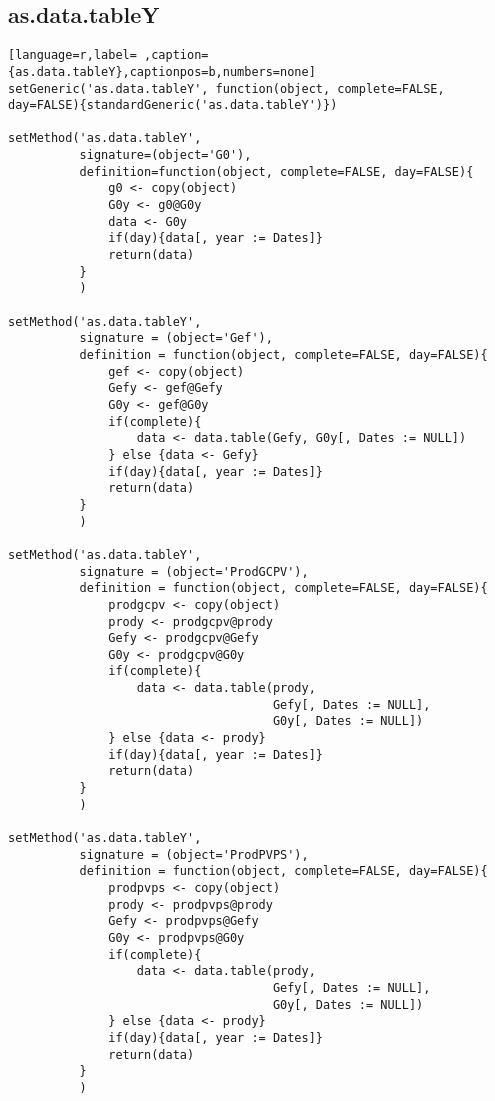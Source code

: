 \subsection{as.data.tableY}
\label{sec:orga7d9ad7}
\label{subsec:as.data.tabley}
\begin{lstlisting}[language=r,label= ,caption={as.data.tableY},captionpos=b,numbers=none]
setGeneric('as.data.tableY', function(object, complete=FALSE, day=FALSE){standardGeneric('as.data.tableY')})

setMethod('as.data.tableY',
          signature=(object='G0'),
          definition=function(object, complete=FALSE, day=FALSE){
              g0 <- copy(object)
              G0y <- g0@G0y
              data <- G0y
              if(day){data[, year := Dates]}
              return(data)
          }
          )

setMethod('as.data.tableY',
          signature = (object='Gef'),
          definition = function(object, complete=FALSE, day=FALSE){
              gef <- copy(object)
              Gefy <- gef@Gefy
              G0y <- gef@G0y
              if(complete){
                  data <- data.table(Gefy, G0y[, Dates := NULL])
              } else {data <- Gefy}
              if(day){data[, year := Dates]}
              return(data)
          }
          )

setMethod('as.data.tableY',
          signature = (object='ProdGCPV'),
          definition = function(object, complete=FALSE, day=FALSE){
              prodgcpv <- copy(object)
              prody <- prodgcpv@prody
              Gefy <- prodgcpv@Gefy
              G0y <- prodgcpv@G0y
              if(complete){
                  data <- data.table(prody,
                                     Gefy[, Dates := NULL],
                                     G0y[, Dates := NULL])       
              } else {data <- prody}
              if(day){data[, year := Dates]}
              return(data)
          }
          )

setMethod('as.data.tableY',
          signature = (object='ProdPVPS'),
          definition = function(object, complete=FALSE, day=FALSE){
              prodpvps <- copy(object)
              prody <- prodpvps@prody
              Gefy <- prodpvps@Gefy
              G0y <- prodpvps@G0y
              if(complete){
                  data <- data.table(prody,
                                     Gefy[, Dates := NULL],
                                     G0y[, Dates := NULL])       
              } else {data <- prody}
              if(day){data[, year := Dates]}
              return(data)
          }
          )
\end{lstlisting}
